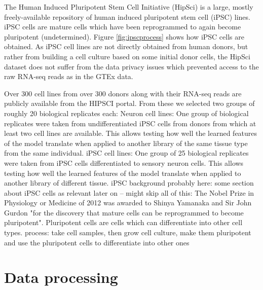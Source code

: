 The Human Induced Pluripotent Stem Cell Initiative (HipSci) is a large, mostly freely-available repository of human induced pluripotent stem cell (iPSC) lines. iPSC cells are mature cells which have been reprogrammed to again become pluripotent (undetermined). Figure \ref{fig:ipscprocess} shows how iPSC cells are obtained. As iPSC cell lines are not directly obtained from human donors, but rather from building a cell culture based on some initial donor cells, the HipSci dataset does not suffer from the data privacy issues which prevented access to the raw RNA-seq reads as in the GTEx data.


Over 300 cell lines from over 300 donors along with their RNA-seq reads are publicly available from the HIPSCI portal. From these we selected two groups of roughly 20 biological replicates each:
Neuron cell lines: One group of biological replicates were taken from undifferentiated iPSC cells from donors from which at least two cell lines are available. This allows testing how well the learned features of the model translate when applied to another library of the same tissue type from the same individual.
iPSC cell lines: One group of 25 biological replicates were taken from iPSC cells differentiated to sensory neuron cells. This allows testing how well the learned features of the model translate when applied to another library of different tissue.
iPSC background probably here:
some section about iPSC cells as relevant later on -- might skip all of this:
The Nobel Prize in Physiology or Medicine of 2012 was awarded to Shinya Yamanaka and Sir John Gurdon "for the discovery that mature cells can be reprogrammed to become pluripotent". Pluripotent cells are cells which can differentiate into other cell types.
process: take cell samples, then grow cell culture, make them pluripotent and use the pluripotent cells to differentiate into other ones
\section{Data processing}\label{sec:dataprocessing}
